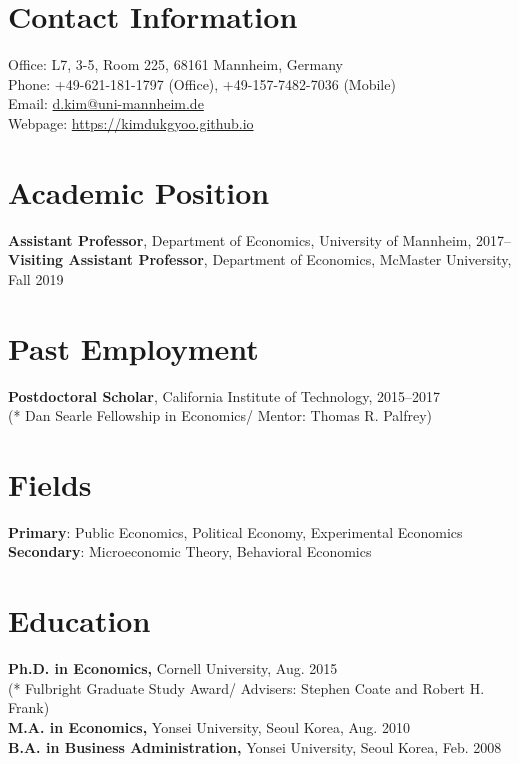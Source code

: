 \documentclass[margin, letterpaper]{res}
\begin{document}
 

\begin{resume} 
\section{Contact Information} Office: L7, 3-5, Room 225, 68161 Mannheim, Germany\\
Phone: +49-621-181-1797 (Office), +49-157-7482-7036 (Mobile)\\
Email: \href{mailto:d.kim@uni-mannheim.de}{d.kim@uni-mannheim.de}\\
Webpage: \url{https://kimdukgyoo.github.io}

\section{Academic Position}
\textbf{Assistant Professor}, Department of Economics, University of Mannheim, 2017--\\
\textbf{Visiting Assistant Professor}, Department of Economics, McMaster University, Fall 2019

\section{Past Employment}
\textbf{Postdoctoral Scholar}, California Institute of Technology, 2015--2017\\
(* Dan Searle Fellowship in Economics/ Mentor: Thomas R. Palfrey)

\section{Fields}
\textbf{Primary}: Public Economics, Political Economy, Experimental Economics\\
\textbf{Secondary}: Microeconomic Theory, Behavioral Economics

\section{Education} 
\textbf{Ph.D. in Economics,} Cornell University, Aug. 2015\\
(* Fulbright Graduate Study Award/ Advisers: Stephen Coate and Robert H. Frank)\\
\textbf{M.A. in Economics,} Yonsei University, Seoul Korea,  Aug. 2010\\
\textbf{B.A. in Business Administration,} Yonsei University, Seoul Korea, Feb. 2008


\end{resume}
\end{document}
